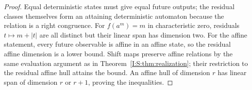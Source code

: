\begin{proof}
Equal deterministic states must give equal future outputs; the residual classes themselves form an attaining deterministic automaton because the relation is a right congruence. For $f(a^m)=m$ in characteristic zero, residuals $t\mapsto m+|t|$ are all distinct but their linear span has dimension two. For the affine statement, every future observable is affine in an affine state, so the residual affine dimension is a lower bound. Shift maps preserve affine relations by the same evaluation argument as in Theorem~\ref{I:S:thm:realization}; their restriction to the residual affine hull attains the bound. An affine hull of dimension $r$ has linear span of dimension $r$ or $r+1$, proving the inequalities.
\end{proof}
